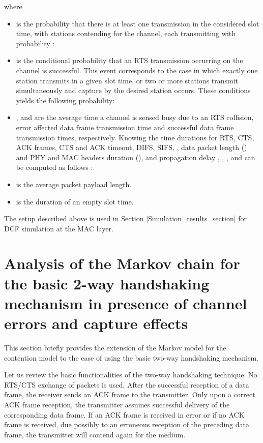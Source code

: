 \documentclass[10pt,onecolumn,a4paper]{IEEEtran}
\begin{document}
where
\begin{itemize}
\item  is the probability that there is at least one
transmission in the considered slot time, with  stations
contending for the channel, each transmitting with probability
:


\item  is the conditional probability that an RTS
transmission occurring on the channel is successful. This event
corresponds to the case in which exactly one station transmits in
a given slot time, or two or more stations transmit simultaneously
and capture by the desired station occurs. These conditions yields the following
probability:


\item ,  and  are the average time a  channel is
sensed busy due to an RTS collision, error affected data frame
transmission time and successful data frame transmission times,
respectively. Knowing the time durations for RTS, CTS, ACK frames,
CTS and ACK timeout, DIFS, SIFS, , data packet length () and
PHY and MAC headers duration (), and propagation delay ,
, , and  can be computed as follows \cite{kong}:

\item  is the average packet payload length.

\item  is the duration of an empty slot time.
\end{itemize}
The setup described above is used in Section
\ref{Simulation_results_section} for DCF simulation at the MAC
layer.
\section{Analysis of the Markov chain for the basic 2-way handshaking mechanism in
presence of channel errors and capture effects}
This section briefly provides the extension of the Markov model
for the contention model to the case of using the basic two-way
handshaking mechanism.

Let us review the basic functionalities of the two-way handshaking
technique. No RTS/CTS exchange of packets is used.
After the successful reception of a data frame, the
receiver sends an ACK frame to the transmitter. Only upon a
correct ACK frame reception, the transmitter assumes successful
delivery of the corresponding data frame. If an ACK frame is
received in error or if no ACK frame is received, due possibly to
an erroneous reception of the preceding data frame, the
transmitter will contend again for the medium.
\end{document}
